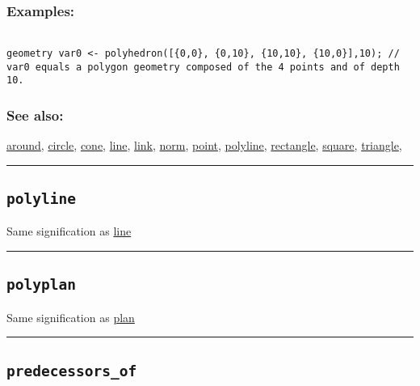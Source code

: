 \documentclass[]{book}
\theoremstyle{definition}
\theoremstyle{definition}
\theoremstyle{definition}
\theoremstyle{remark}
\begin{document}
\subsubsection{Examples:}\label{examples-288}

\begin{verbatim}
 
geometry var0 <- polyhedron([{0,0}, {0,10}, {10,10}, {10,0}],10); // var0 equals a polygon geometry composed of the 4 points and of depth 10.
\end{verbatim}

\subsubsection{See also:}\label{see-also-167}

\href{OperatorsAA\#around}{around}, \href{OperatorsBC\#circle}{circle},
\href{OperatorsBC\#cone}{cone}, \href{OperatorsIM\#line}{line},
\href{OperatorsIM\#link}{link}, \href{OperatorsNR\#norm}{norm},
\href{OperatorsNR\#point}{point},
\href{OperatorsNR\#polyline}{polyline},
\href{OperatorsNR\#rectangle}{rectangle},
\href{OperatorsSZ\#square}{square},
\href{OperatorsSZ\#triangle}{triangle},

\begin{center}\rule{0.5\linewidth}{\linethickness}\end{center}

\subsection{\texorpdfstring{\texttt{polyline}}{polyline}}\label{polyline}

Same signification as \href{OperatorsIM\#line}{line}

\begin{center}\rule{0.5\linewidth}{\linethickness}\end{center}

\subsection{\texorpdfstring{\texttt{polyplan}}{polyplan}}\label{polyplan}

Same signification as \href{OperatorsNR\#plan}{plan}

\begin{center}\rule{0.5\linewidth}{\linethickness}\end{center}

\subsection{\texorpdfstring{\texttt{predecessors\_of}}{predecessors\_of}}\label{predecessors_of}
\end{document}
